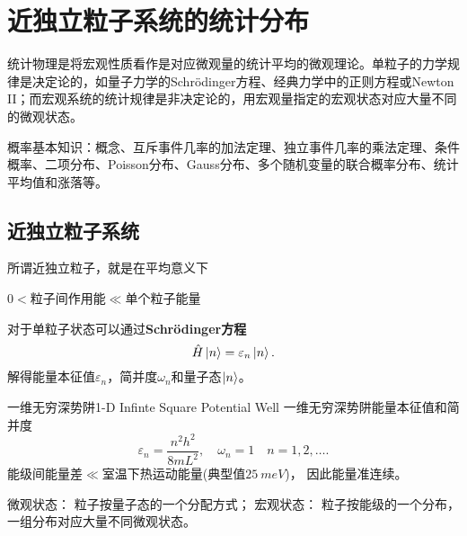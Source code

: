 \newcommand{\Om}[1][]{\Omega_{\mathrm{#1}}}

\chapter{近独立粒子系统的统计分布}
统计物理是将宏观性质看作是对应微观量的统计平均的微观理论。单粒子的力学规律是决定论的，如量子力学的Schrödinger方程、经典力学中的正则方程或Newton II；而宏观系统的统计规律是非决定论的，用宏观量指定的宏观状态对应大量不同的微观状态。

概率基本知识：概念、互斥事件几率的加法定理、独立事件几率的乘法定理、条件概率、二项分布、Poisson分布、Gauss分布、多个随机变量的联合概率分布、统计平均值和涨落等。

\section{近独立粒子系统}

所谓近独立粒子，就是在平均意义下
\begin{center}
	$0<$粒子间作用能$\ll$单个粒子能量
\end{center}
对于单粒子状态可以通过\textbf{Schrödinger方程}
\[
	\hat H\left\vert n\right\rangle=\varepsilon_n\left\vert n\right\rangle.
\]
解得能量本征值$\varepsilon_n$，简并度$\omega_n$和量子态$\left\vert n\right\rangle$。
\begin{example}{一维无穷深势阱}{1-D Infinte Square Potential Well}
	一维无穷深势阱能量本征值和简并度
	\[
		\varepsilon_n=\frac{n^2h^2}{8mL^2},\quad\omega_n=1\quad n=1,2,\ldots.
	\]
	能级间能量差$\ll$室温下热运动能量(典型值$\SI{25}{meV}$)，
	因此能量准连续。
\end{example}
微观状态：
粒子按量子态的一个分配方式；
宏观状态：
粒子按能级的一个分布，%
一组分布对应大量不同微观状态。

